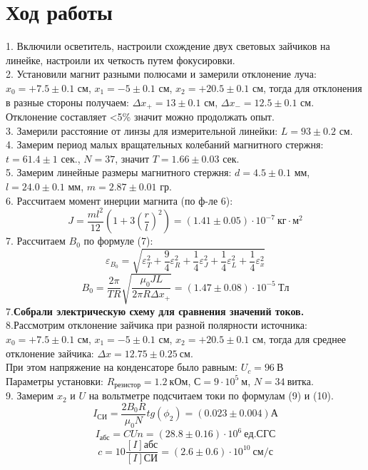 \documentclass[a4paper, 12pt]{article}%
\begin{document}
 \section{Ход работы}
 1. Включили осветитель, настроили схождение двух световых зайчиков на линейке, настроили их четкость путем фокусировки.\\
 2. Установили магнит разными полюсами и замерили отклонение луча:\\
 $x_0 = +7.5 \pm 0.1$ см, $x_1 = -5 \pm 0.1$ см, $x_2 = +20.5 \pm 0.1$ см, тогда для отклонения в разные стороны получаем: $\Delta x_+ = 13 \pm 0.1$ см,  $\Delta x_- = 12.5 \pm 0.1$ см. Отклонение составляет <5\% значит можно продолжать опыт.\\
 3. Замерили расстояние от линзы для измерительной линейки: $L = 93\pm 0.2$ см.\\
 4. Замерим период малых вращательных колебаний магнитного стержня:\\
 $t = 61.4 \pm 1$ сек., $N = 37$, значит $T = 1.66 \pm 0.03$ сек.\\
 5. Замерим линейные размеры магнитного стержня: $d = 4.5 \pm 0.1$ мм, $l = 24.0 \pm 0.1$ мм, $m = 2.87 \pm 0.01$ гр.\\
 6. Рассчитаем момент инерции магнита (по ф-ле 6): \\
 \begin{equation}
 	J = \frac{ml^2}{12}(1 + 3( \frac{r}{l})^2) = (1.41 \pm 0.05) \cdot 10^{-7}~ кг\cdot м^2
 \end{equation}
 7. Рассчитаем $B_0$ по формуле (7):\\ 
 \begin{equation*}
 	\varepsilon_{B_0} = \sqrt{\varepsilon_{T}^2+\frac{9}{4}\varepsilon_{R}^2 + \frac{1}{4}\varepsilon_{J}^2 + \frac{1}{4}\varepsilon_{L}^2+ \frac{1}{4}\varepsilon_{x}^2}
 \end{equation*}
 \begin{equation*}
 	B_0 = \frac{2 \pi}{TR} \sqrt{\frac{\mu_0 JL}{2\pi R \Delta x_+}}= (1.47 \pm 0.08) \cdot 10^{-5} ~Тл
 \end{equation*}
 7.\textbf{Собрали электрическую схему для сравнения значений токов.}\\
 8.Рассмотрим отклонение зайчика при разной полярности источника:\\
 $x_0 = +7.5 \pm 0.1$ см, $x_1 = -5 \pm 0.1$ см, $x_2 = +20.5 \pm 0.1$ см, тогда для среднее отклонение зайчика: $\Delta x = 12.75 \pm 0.25~ см$.\\
 При этом напряжение на конденсаторе было равным: $U_c = 96~В$\\
 Параметры установки: $R_{резистор} = 1.2 ~кОм$, $С = 9 \cdot 10^5 ~м$, $N = 34~витка$.\\
 9. Замерим $x_2$ и $U$ на вольтметре подсчитаем токи по формулам (9) и (10).
 \begin{equation*}
 		I_{СИ} = \frac{2B_0 R}{\mu_0 N} tg(\phi_2) = (0.023 \pm 0.004) А
 \end{equation*}
 \begin{equation*}
	I_{абс} = CUn = (28.8\pm 0.16) \cdot 10^6 ~ед.СГС
 \end{equation*}
\begin{equation}
	c = 10 \frac{[I]абс}{[I]СИ} = (2.6 \pm 0.6) \cdot 10^{10}~см/с
\end{equation}
\end{document}
